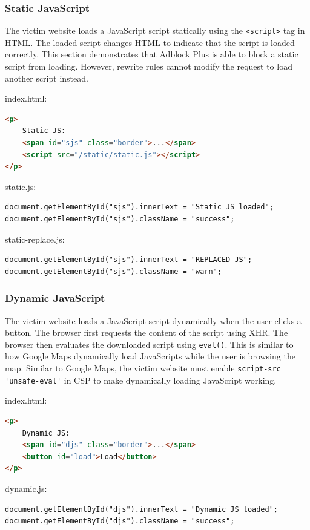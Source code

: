 \documentclass[conference]{IEEEtran}
\begin{document}
\subsubsection{Static JavaScript}

The victim website loads a JavaScript script statically using the \lstinline{<script>} tag in HTML. The loaded script changes HTML to indicate that the script is loaded correctly. This section demonstrates that Adblock Plus is able to block a static script from loading. However, rewrite rules cannot modify the request to load another script instead.

index.html:
\begin{lstlisting}[language=HTML]
<p>
    Static JS:
    <span id="sjs" class="border">...</span>
    <script src="/static/static.js"></script>
</p>
\end{lstlisting}

static.js:
\begin{lstlisting}
document.getElementById("sjs").innerText = "Static JS loaded";
document.getElementById("sjs").className = "success";
\end{lstlisting}

static-replace.js:
\begin{lstlisting}
document.getElementById("sjs").innerText = "REPLACED JS";
document.getElementById("sjs").className = "warn";
\end{lstlisting}

\subsubsection{Dynamic JavaScript}

The victim website loads a JavaScript script dynamically when the user clicks a button. The browser first requests the content of the script using XHR. The browser then evaluates the downloaded script using \lstinline{eval()}. This is similar to how Google Maps dynamically load JavaScripts while the user is browsing the map. Similar to Google Maps, the victim website must enable \lstinline{script-src 'unsafe-eval'} in CSP to make dynamically loading JavaScript working.

index.html:
\begin{lstlisting}[language=HTML]
<p>
    Dynamic JS:
    <span id="djs" class="border">...</span>
    <button id="load">Load</button>
</p>
\end{lstlisting}

dynamic.js:
\begin{lstlisting}
document.getElementById("djs").innerText = "Dynamic JS loaded";
document.getElementById("djs").className = "success";
\end{lstlisting}
\end{document}
